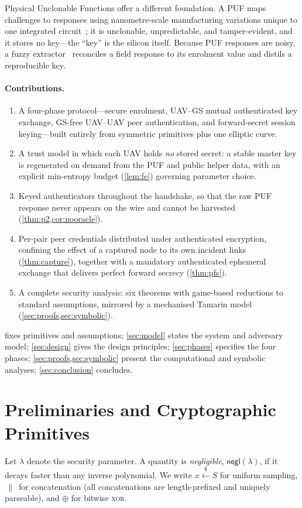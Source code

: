 \documentclass[11pt,a4paper]{article}
\theoremstyle{jrnlplain}
\theoremstyle{jrnldef}
\newcommand{\secpar}{\lambda}
\newcommand{\getsr}{\xleftarrow{\$}}
\newcommand{\negl}{\mathsf{negl}}
\newcommand{\catt}{\,\|\,}
\newcommand{\xorop}{\oplus}
\begin{document}
Physical Unclonable Functions offer a different foundation. A PUF maps
challenges to responses using nanometre-scale manufacturing variations unique
to one integrated circuit~\cite{suh2007}; it is unclonable, unpredictable, and
tamper-evident, and it stores no key---the ``key'' is the silicon itself.
Because PUF responses are noisy, a fuzzy extractor~\cite{dodis2008} reconciles
a field response to its enrolment value and distils a reproducible key.

\paragraph{Contributions.}
\begin{enumerate}[leftmargin=1.6em,label=\textbf{C\arabic*.}]
\item A four-phase protocol---secure enrolment, UAV--GS mutual
authenticated key exchange, GS-free UAV--UAV peer authentication, and
forward-secret session keying---built entirely from symmetric primitives plus
one elliptic curve.
\item A trust model in which each UAV holds \emph{no} stored secret: a stable
master key is regenerated on demand from the PUF and public helper data, with
an explicit min-entropy budget (\cref{lem:fe}) governing parameter choice.
\item Keyed authenticators throughout the handshake, so that the raw PUF
response never appears on the wire and cannot be harvested
(\cref{thm:p2,cor:nooracle}).
\item Per-pair peer credentials distributed under authenticated encryption,
confining the effect of a captured node to its own incident links
(\cref{thm:capture}), together with a mandatory authenticated ephemeral
exchange that delivers perfect forward secrecy (\cref{thm:pfs}).
\item A complete security analysis: six theorems with game-based reductions
to standard assumptions, mirrored by a mechanised Tamarin model
(\cref{sec:proofs,sec:symbolic}).
\end{enumerate}

 fixes primitives and assumptions; \cref{sec:model} states
the system and adversary model; \cref{sec:design} gives the design
principles; \cref{sec:phases} specifies the four phases;
\cref{sec:proofs,sec:symbolic} present the computational and symbolic
analyses; \cref{sec:conclusion} concludes.

\section{Preliminaries and Cryptographic Primitives}
\label{sec:prelim}
Let $\secpar$ denote the security parameter. A quantity is \emph{negligible},
$\negl(\secpar)$, if it decays faster than any inverse polynomial. We write
$x\getsr S$ for uniform sampling, $\catt$ for concatenation (all
concatenations are length-prefixed and uniquely parseable), and $\xorop$ for
bitwise \textsc{xor}.
\end{document}
